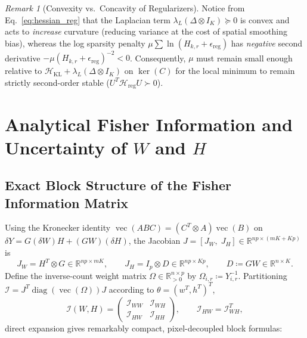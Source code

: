 \documentclass[11pt,a4paper]{article}
\theoremstyle{plain}
\theoremstyle{definition}
\theoremstyle{remark}
\newtheorem{remark}[theorem]{Remark}
\newcommand{\R}{\mathbb{R}}
\newcommand{\cI}{\mathcal{I}}
\newcommand{\cH}{\mathcal{H}}
\newcommand{\vecop}{\operatorname{vec}}
\newcommand{\diag}{\operatorname{diag}}
\newcommand{\kron}{\otimes}
\begin{document}
\begin{remark}[Convexity vs.\ Concavity of Regularizers]
Notice from Eq.~\eqref{eq:hessian_reg} that the Laplacian term $\lambda_L (\Delta \kron I_K) \succeq 0$ is convex and acts to \emph{increase} curvature (reducing variance at the cost of spatial smoothing bias), whereas the log sparsity penalty $\mu \sum \ln(H_{k,r} + \epsilon_{\text{reg}})$ has \emph{negative} second derivative $-\mu(H_{k,r}+\epsilon_{\text{reg}})^{-2} < 0$. Consequently, $\mu$ must remain small enough relative to $\cH_{\text{KL}} + \lambda_L(\Delta \kron I_K)$ on $\ker(C)$ for the local minimum to remain strictly second-order stable ($U^T \cH_{\text{reg}} U \succ 0$).
\end{remark}

\section{Analytical Fisher Information and Uncertainty of \texorpdfstring{$W$}{W} and \texorpdfstring{$H$}{H}}

\subsection{Exact Block Structure of the Fisher Information Matrix}
Using the Kronecker identity $\vecop(A B C) = (C^T \kron A)\vecop(B)$ on $\delta Y = G(\delta W)H + (GW)(\delta H)$, the Jacobian $J = [J_W,\; J_H] \in \R^{np \times (mK + Kp)}$ is
\begin{equation}
\label{eq:jacobian}
J_W = H^T \kron G \in \R^{np \times mK}, \qquad J_H = I_p \kron D \in \R^{np \times Kp}, \qquad D \coloneqq GW \in \R^{n \times K}.
\end{equation}
Define the inverse-count weight matrix $\Omega \in \R_{>0}^{n \times p}$ by $\Omega_{i,r} \coloneqq Y_{i,r}^{-1}$. Partitioning $\cI = J^T \diag(\vecop(\Omega)) J$ according to $\theta = (w^T, h^T)^T$,
\begin{equation}
\label{eq:fim_blocks}
\cI(W,H) = \begin{pmatrix} \cI_{WW} & \cI_{WH} \\ \cI_{HW} & \cI_{HH} \end{pmatrix}, \qquad \cI_{HW} = \cI_{WH}^T,
\end{equation}
direct expansion gives remarkably compact, pixel-decoupled block formulas:
\end{document}
